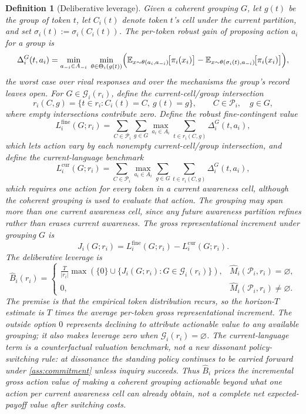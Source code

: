 \documentclass[11pt]{article}
\newtheorem{definition}[assumption]{Definition}
\theoremstyle{definition}
\newcommand{\emptysetset}{\varnothing}
\begin{document}
\begin{definition}[Deliberative leverage]
\label{def:leverage}
Given a coherent grouping $G$, let $g(t)$ be the group of token $t$, let $C_i(t)$ denote token $t$'s cell under the current partition, and set $\sigma_i(t):=\sigma_i(C_i(t))$.
The \emph{per-token robust gain} of proposing action $a_i$ for a group is
\[
\Delta_i^G(t,a_i)
=
\min_{a_{-i}\in A_{-i}}\;
\min_{\theta\in\Theta_i(g(t))}
\Bigl(
\mathbb E_{x\sim\theta(a_i,a_{-i})}\!\bigl[\pi_i(x_i)\bigr]
-
\mathbb E_{x\sim\theta(\sigma_i(t),a_{-i})}\!\bigl[\pi_i(x_i)\bigr]
\Bigr),
\]
the worst case over rival responses and over the mechanisms the group's record leaves open.
For $G\in\mathcal G_i(r_i)$, define the current-cell/group intersection
\[
 r_i(C,g)
=
\{t\in r_i:C_i(t)=C,\ g(t)=g\},
\qquad C\in\mathcal P_i,\quad g\in G,
\]
where empty intersections contribute zero.
Define the robust fine-contingent value
\[
L_i^{\mathrm{fine}}(G;r_i)
=
\sum_{C\in\mathcal P_i}
\sum_{g\in G}
\max_{a_i\in A_i}
\sum_{t\in r_i(C,g)}
\Delta_i^G(t,a_i),
\]
which lets action vary by each nonempty current-cell/group intersection, and define the current-language benchmark
\[
L_i^{\mathrm{cur}}(G;r_i)
=
\sum_{C\in\mathcal P_i}
\max_{a_i\in A_i}
\sum_{g\in G}
\sum_{t\in r_i(C,g)}
\Delta_i^G(t,a_i),
\]
which requires one action for every token in a current awareness cell, although the coherent grouping is used to evaluate that action.
The grouping may span more than one current awareness cell, since any future awareness partition refines rather than erases current awareness.
The \emph{gross representational increment} under grouping $G$ is
\[
J_i(G;r_i)
=
L_i^{\mathrm{fine}}(G;r_i)-L_i^{\mathrm{cur}}(G;r_i).
\]
The \emph{deliberative leverage} is
\begin{equation}
\widehat B_i(r_i)
=
\begin{cases}
\displaystyle
\frac{T}{\lvert r_i\rvert}
\max\!\left(
\{0\}\cup
\{J_i(G;r_i):G\in\mathcal G_i(r_i)\}
\right),
&
\widehat M_i(\mathcal P_i,r_i)=\emptysetset,
\\[1.1em]
0,
&
\widehat M_i(\mathcal P_i,r_i)\neq\emptysetset.
\end{cases}
\label{eq:leverage}
\end{equation}
The premise is that the empirical token \emph{distribution} recurs, so the horizon-$T$ estimate is $T$ times the average per-token gross representational increment.
The outside option $0$ represents declining to attribute actionable value to any available grouping; it also makes leverage zero when $\mathcal G_i(r_i)=\emptysetset$.
The current-language term is a counterfactual valuation benchmark, not a new dissonant policy-switching rule: at dissonance the standing policy continues to be carried forward under \cref{ass:commitment} unless inquiry succeeds.
Thus $\widehat B_i$ prices the incremental gross action value of making a coherent grouping actionable beyond what one action per current awareness cell can already obtain, not a complete net expected-payoff value after switching costs.
\end{definition}
\end{document}
